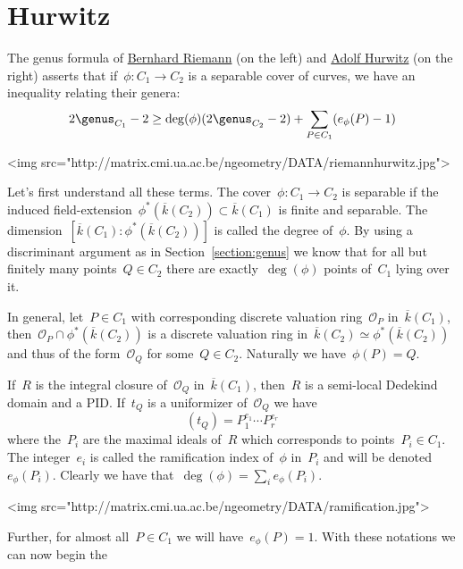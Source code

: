 \section{Hurwitz}
The genus formula of \href{http://en.wikipedia.org/wiki/Bernhard_Riemann}{Bernhard Riemann} (on the left) and \href{http://en.wikipedia.org/wiki/Adolf_Hurwitz}{Adolf Hurwitz} (on the right) asserts that if~$\phi\colon C_1 \rightarrow C_2$ is a separable cover of curves, we have an inequality relating their genera:
\begin{equation}
  2 \genus_{C_1} - 2 \geq \deg(\phi)(2 \genus_{C_2} -2) + \sum_{P \in C_1} (e_{\phi}(P)-1)
\end{equation}

<img src="http://matrix.cmi.ua.ac.be/ngeometry/DATA/riemannhurwitz.jpg">

Let's first understand all these terms. The cover~$\phi\colon C_1 \rightarrow C_2$ is separable if the induced field-extension~$\phi^{\ast}(\overline{k}(C_2)) \subset \overline{k}(C_1)$ is finite and separable. The dimension~$[\overline{k}(C_1) : \phi^{\ast}(\overline{k}(C_2))]$ is called the degree of~$\phi$. By using a discriminant argument as in Section~\ref{section:genus} we know that for all but finitely many points~$Q \in C_2$ there are exactly~$\deg(\phi)$ points of~$C_1$ lying over it.

In general, let~$P \in C_1$ with corresponding discrete valuation ring~$\mathcal{O}_P$ in~$\overline{k}(C_1)$, then~$\mathcal{O}_P \cap \phi^*(\overline{k}(C_2))$ is a discrete valuation ring in~$\overline{k}(C_2) \simeq \phi^*(\overline{k}(C_2))$ and thus of the form~$\mathcal{O}_Q$ for some~$Q \in C_2$. Naturally we have~$\phi(P)=Q$.

If~$R$ is the integral closure of~$\mathcal{O}_Q$ in~$\overline{k}(C_1)$, then~$R$ is a semi-local Dedekind domain and a PID. If~$t_Q$ is a uniformizer of~$\mathcal{O}_Q$ we have
\begin{equation}
  (t_Q) = P_1^{e_1} \cdots P_r^{e_r}
\end{equation}
where the~$P_i$ are the maximal ideals of~$R$ which corresponds to points~$P_i \in C_1$. The integer~$e_i$ is called the ramification index of~$\phi$ in~$P_i$ and will be denoted~$e_{\phi}(P_i)$. Clearly we have that~$\deg(\phi) = \sum_i e_{\phi}(P_i)$. 

<img src="http://matrix.cmi.ua.ac.be/ngeometry/DATA/ramification.jpg">

Further, for almost all~$P \in C_1$ we will have~$e_{\phi}(P)=1$. With these notations we can now begin the

